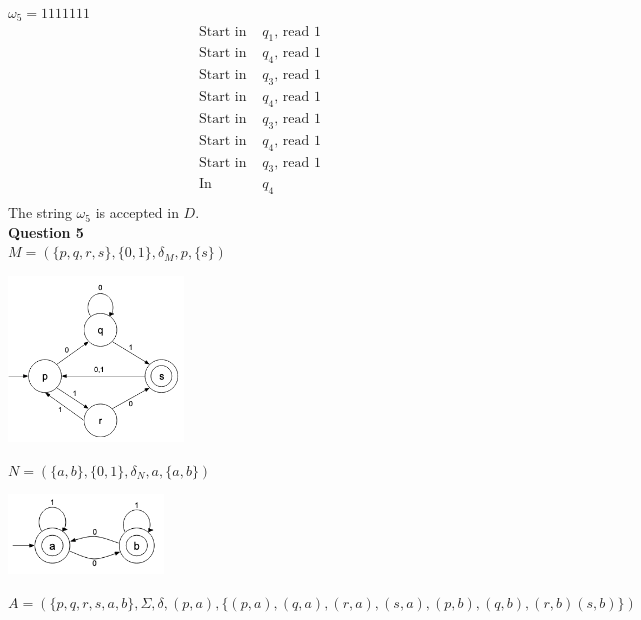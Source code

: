 \documentclass{article}
\begin{document}
$\omega_5=1111111$\\
\begin{equation*}
    \begin{split}
        \text{Start in } & q_1 \text{, read } 1\\
        \text{Start in } & q_4 \text{, read } 1\\
        \text{Start in } & q_3 \text{, read } 1\\
        \text{Start in } & q_4 \text{, read } 1\\
        \text{Start in } & q_3 \text{, read } 1\\
        \text{Start in } & q_4 \text{, read } 1\\
        \text{Start in } & q_3 \text{, read } 1\\
        \text{In } & q_4\\
    \end{split}
\end{equation*}
The string $\omega_5$ is accepted in $D$.\\

\break
{\bf Question 5}\\ 
$M=(\{p,q,r,s\},\{0,1\},\delta_{M},p,\{s\})$\\
\begin{center}
    \includegraphics[width=0.35\textwidth]{5-1.png}
\end{center}

$N=(\{a,b\},\{0,1\},\delta_{N},a,\{a,b\})$\\
\begin{center}
    \includegraphics[width=0.31\textwidth]{5-2.png}
\end{center}


$A=(\{p,q,r,s,a,b\}, \Sigma, \delta, (p,a), \{(p,a),(q,a),(r,a),(s,a),(p,b),(q,b),(r,b)(s,b)\})$\\
\end{document}
